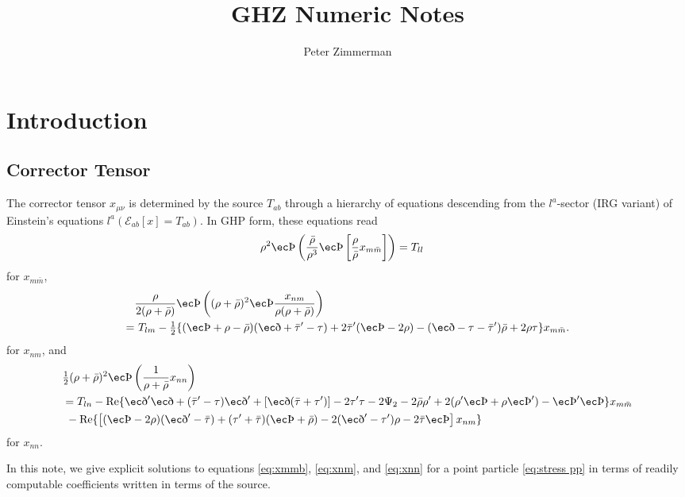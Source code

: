 \documentclass[preprint,aps,nofootinbib,a4paper,superscriptaddress,longbibliography,amsfonts, amssymb,amsmath,titlepage]{revtex4-1}
\numberwithin{equation}{section} %
\def\half{\tfrac{1}{2}}
\def\tap{\tau'}
\def\rhb{\bar\rho}
\def\tab{\bar\tau}
\def\mb{\bar m}
\def\th{\hbox{\ec\char'336}}
\def\edth{\hbox{\ec\char'360}}
\def\edthp{\hbox{\ec\char'360}'}
\renewcommand{\Re}{\operatorname{Re}}
\def\beq{\begin{equation}}
\def\eeq{\end{equation}}
\def\beq{\begin{equation}}
\def\eeq{\end{equation}}
\def\half{\tfrac{1}{2}}
\begin{document}
\title{GHZ Numeric Notes}


\author{Peter Zimmerman}


\maketitle
\tableofcontents

\section{Introduction}\label{sec:introduction}


\subsection{Corrector Tensor}
The corrector tensor $x_{\mu\nu}$ is determined by the source $T_{ab}$ through
a hierarchy of equations descending from the $l^{a}$-sector (IRG variant) of Einstein's equations $l^{a}(\mathcal E_{ab}[x] = T_{ab}).$  In GHP form, these equations read \cite{Green:2019nam}
\beq
\label{eq:xmmb}
\begin{split}
 \rho^2 \th \left( \frac{\rhb}{\rho^3} \th \left[\frac{\rho}{\rhb} x_{m\mb} \right] \right)&= T_{ll}
\end{split}
\eeq
for $x_{m\mb}$, 
\beq
\label{eq:xnm}
\begin{split}
& \frac{\rho}{2(\rho+\rhb)} 
\th\left( (\rho+\rhb)^2\th \frac{x_{nm}}{\rho(\rho+\rhb)}\right)  \\
=&\ T_{lm} - \half\{(\th+\rho-\rhb)(\edth+\tab'-\tau) + 2\tab'(\th-2\rho) -
(\edth-\tau-\tab')\rhb +2\rho\tau\}x_{m\mb}.
\end{split}
\eeq
for $x_{nm}$, and
\beq
\label{eq:xnn}
\begin{split}
 &\half (\rho+\rhb)^2\th \left( \frac{1}{\rho+\rhb}x_{nn} \right)\\
&= T_{ln}- \Re\{ \edthp \edth  + (\tab'-\tau)\edthp + \left[\edth(\tab+\tau')\right] - 2 \tau'\tau - 2 \Psi_2 -2 \rhb\rho' + 2(\rho' \th + \rho\th') -  \th'\th \}  x_{m\mb} \\
&\ -\Re  \{\left[
(\th-2\rho)(\edthp-\tab) + (\tap+\tab)(\th+\rhb)
-2(\edthp-\tap)\rho-2\tab\th\right] x_{nm} \}
\end{split}
\eeq
for $x_{nn}$. 

In this note, we give explicit solutions to equations \eqref{eq:xmmb}, \eqref{eq:xnm}, and \eqref{eq:xnn} for a point particle \eqref{eq:stress pp} in terms of readily computable coefficients written in terms of the source.  
\end{document}
